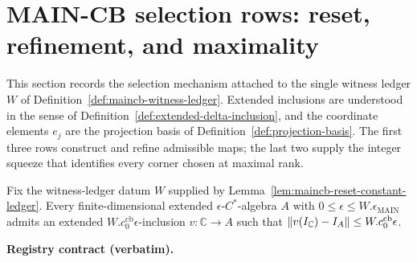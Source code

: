 \section{MAIN-CB selection rows: reset, refinement, and maximality}\label{sec:maincb-selection}

This section records the selection mechanism attached to the single witness ledger $W$ of
Definition~\ref{def:maincb-witness-ledger}.  Extended inclusions are understood in the sense of
Definition~\ref{def:extended-delta-inclusion}, and the coordinate elements $e_j$ are the projection
basis of Definition~\ref{def:projection-basis}.  The first three rows construct and refine admissible
maps; the last two supply the integer squeeze that identifies every corner chosen at maximal rank.

\begin{lemma}\label{lem:maincb-initial-reset-inclusion}
Fix the witness-ledger datum $W$ supplied by Lemma~\ref{lem:maincb-reset-constant-ledger}.  Every
finite-dimensional extended $\epsilon$-$C^*$-algebra $A$ with
$0\leq\epsilon\leq W.\epsilon_{\mathrm{MAIN}}$ admits an extended
$W.c^{\mathrm{cb}}_0\epsilon$-inclusion $v:\mathbb C\to A$ such that
$\lVert v(I_{\mathbb C})-I_A\rVert\leq W.c^{\mathrm{cb}}_0\epsilon$.
\end{lemma}

\noindent\textbf{Registry contract (verbatim).}

